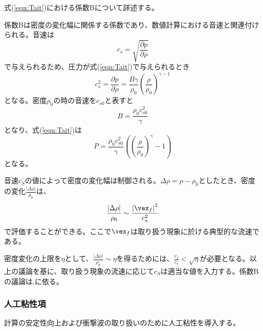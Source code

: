 \documentclass[]{jsarticle}
\begin{document}
式(\ref{eqn:Tait})における係数Bについて詳述する。

係数Bは密度の変化幅に関係する係数であり、数値計算における音速と関連付けられる。音速は
\begin{equation}
c_s=\sqrt{\frac{\partial p}{\partial \rho}}
\end{equation}
で与えられるため、圧力が式(\ref{eqn:Tait})で与えられるとき
\begin{equation}
c_s^2=\frac{\partial p}{\partial \rho}=\frac{B\gamma}{\rho_0}\left(\frac{\rho}{\rho_0}\right)^{\gamma -1}
\end{equation}
となる。密度$\rho_0$の時の音速を$c_{s0}$と表すと
\begin{equation}
B=\frac{\rho_0c_{s0}^2}{\gamma}
\end{equation}
となり、式(\ref{eqn:Tait})は
\begin{equation}
P=\frac{\rho_0c_{s0}^2}{\gamma}\left(\left(\frac{\rho}{\rho_0}\right)^\gamma-1\right)
\end{equation}
となる。

音速$c_S$の値によって密度の変化幅は制御される。$\Delta \rho=\rho-\rho_0$としたとき、密度の変化$\frac{\left| \Delta \rho \right|}{\rho_0}$は、
\begin{equation}
\frac{\left| \Delta \rho \right|}{\rho_0}\sim \frac{\left| \vex_f \right|^2}{c_s^2}
\end{equation}
で評価することができる。ここで$\vex_f$は取り扱う現象に於ける典型的な流速である。

密度変化の上限を$\eta$として、$\frac{\left| \Delta \rho \right|}{\rho_0}\sim \eta$を得るためには、$\frac{v_f}{c_s}<\sqrt{\eta}$が必要となる。以上の議論を基に、取り扱う現象の流速に応じて$c_S$は適当な値を入力する。係数Bの議論は\cite{Becker2007},\cite{Gotoh2018}に依る。


\subsubsection{人工粘性項}
計算の安定性向上および衝撃波の取り扱いのために人工粘性を導入する。
\end{document}
